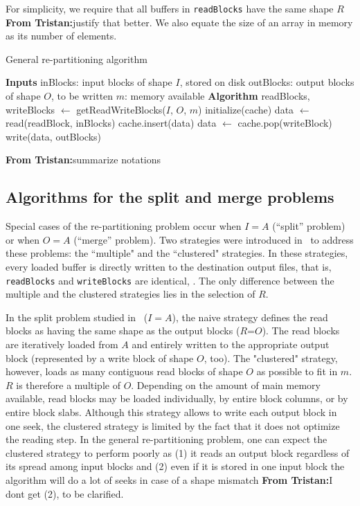 \documentclass[sigconf, nonacm]{acmart}
\newcommand{\tristan}[1]{\color{orange}\textbf{From Tristan:}#1\color{black}}
\begin{document}
For simplicity, we require that all buffers in \texttt{readBlocks} have
the same shape $R$ \tristan{justify that better}. We also equate the size of an
array in memory as its number of elements.


\begin{algorithm}
  \caption{General re-partitioning algorithm}
  \label{algo:generalrepartition}
  \begin{algorithmic}[1]
    \STATE \textbf{Inputs}
    \STATE inBlocks: input blocks of shape $I$, stored on disk
    \STATE outBlocks: output blocks of shape $O$, to be written
    \STATE $m$: memory available
    \STATE
    \STATE \textbf{Algorithm}
    \STATE readBlocks, writeBlocks $\leftarrow$ getReadWriteBlocks($I$, $O$, $m$)
    \STATE initialize(cache)
      \STATE data $\leftarrow$ read(readBlock, inBlocks)
      \STATE cache.insert(data)
          \STATE data $\leftarrow$ cache.pop(writeBlock)
          \STATE write(data, outBlocks)
        \ENDIF
      \ENDFOR
    \ENDFOR

  \end{algorithmic}
\end{algorithm}

\tristan{summarize notations}

\subsection{Algorithms for the split and merge problems}

Special cases of the re-partitioning problem occur when $I=A$ (``split'' problem)
or when $O=A$ (``merge'' problem). Two strategies were introduced
in~\cite{seqalgorithms} to address these problems: the ``multiple" and the
``clustered" strategies. In these strategies, every loaded buffer is directly written to the
destination output files, that is, \texttt{readBlocks} and \texttt{writeBlocks} are identical, .
The only difference between the multiple and the clustered strategies lies in
the selection of $R$.

In the split problem studied in~\cite{seqalgorithms} ($I=A$), the naive
strategy defines the read blocks as having the same shape as the output blocks
($R$=$O$). The read blocks are iteratively loaded from $A$ and entirely written
to the appropriate output block (represented by a write block of shape $O$, too).
The "clustered" strategy, however, loads as
many contiguous read blocks of shape $O$ as possible to fit in $m$.
$R$ is therefore a multiple of $O$.
Depending on the amount of main memory available, read blocks may be loaded
individually, by entire block columns, or by entire block slabs.
Although this strategy allows to write each output block in one seek, the clustered strategy is limited by the fact
that it does not optimize the reading step.
In the general re-partitioning problem, one can expect the clustered strategy to
perform poorly as
(1) it reads an output block regardless of its spread among input blocks
and (2) even if it is stored in one input block the algorithm will do a lot of seeks in
case of a shape mismatch \tristan{I dont get (2), to be clarified}.
\end{document}
